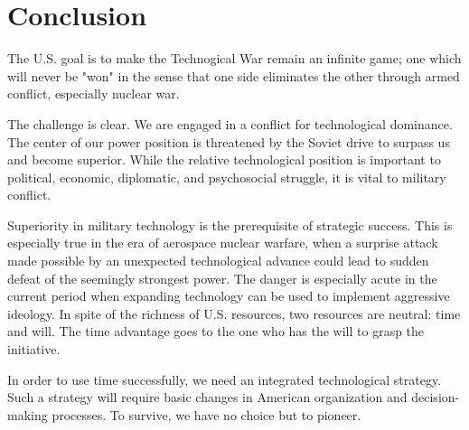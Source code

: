 \section{Conclusion}
The U.S. goal is to make the Technogical War remain an infinite game; one which will never be "won" in the sense that one side eliminates the other through armed conflict, especially nuclear war.

The challenge is clear. We are engaged in a conflict for technological dominance. The center of our power position is threatened by the Soviet drive to surpass us and become superior. While the relative technological position is important to political, economic, diplomatic, and psychosocial struggle, it is vital to military conflict.

Superiority in military technology is the prerequisite of strategic success. This is especially true in the era of aerospace nuclear warfare, when a surprise attack made possible by an unexpected technological advance could lead to sudden defeat of the seemingly strongest power. The danger is especially acute in the current period when expanding technology can be used to implement aggressive ideology. In spite of the richness of U.S. resources, two resources are neutral: time and will. The time advantage goes to the one who has the will to grasp the initiative.

In order to use time successfully, we need an integrated technological strategy. Such a strategy will require basic changes in American organization and decision-making processes. To survive, we have no choice but to pioneer.

\begin{mdframed}[backgroundcolor=black!10, frametitle={THIS PRINCIPLE HAS NOT CHANGED. [1997]}]
\end{mdframed}
